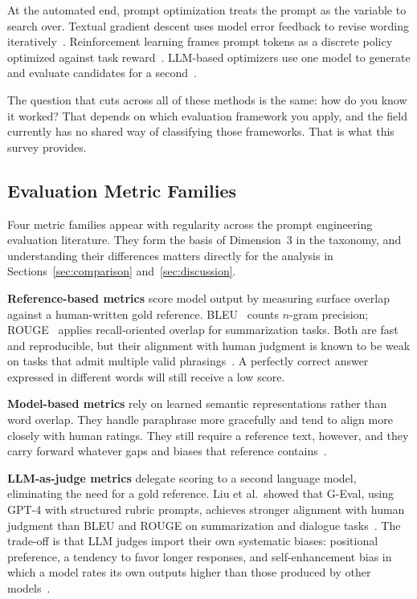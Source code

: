 \documentclass[journal]{IEEEtran}
\begin{document}
At the automated end, prompt optimization treats the prompt as the variable
to search over. Textual gradient descent uses model error feedback to
revise wording iteratively~\cite{pryzant2023apo}. Reinforcement learning
frames prompt tokens as a discrete policy optimized against task
reward~\cite{rlprompt2022}. LLM-based optimizers use one model to generate
and evaluate candidates for a second~\cite{zhou2022ape}.

The question that cuts across all of these methods is the same: how do
you know it worked? That depends on which evaluation framework you apply,
and the field currently has no shared way of classifying those frameworks. That is
what this survey provides.

\subsection{Evaluation Metric Families}

Four metric families appear with regularity across the prompt engineering
evaluation literature. They form the basis of Dimension~3 in the taxonomy, and
understanding their differences matters directly for the analysis in
Sections~\ref{sec:comparison} and~\ref{sec:discussion}.

\textbf{Reference-based metrics} score model output by measuring surface
overlap against a human-written gold reference. BLEU~\cite{papineni2002bleu} counts
$n$-gram precision; ROUGE~\cite{lin2004rouge} applies recall-oriented overlap
for summarization tasks. Both are fast and reproducible, but their alignment with human
judgment is known to be weak on tasks that admit multiple valid
phrasings~\cite{liu2023geval, repairing2022}. A perfectly correct answer expressed
in different words will still receive a low score.

\textbf{Model-based metrics} rely on learned semantic representations rather
than word overlap. They handle paraphrase more gracefully and tend to align more closely
with human ratings. They still require a reference text, however, and they
carry forward whatever gaps and biases that reference contains~\cite{chang2023survey}.

\textbf{LLM-as-judge metrics} delegate scoring to a second language model,
eliminating the need for a gold reference. Liu et al.\ showed that G-Eval, using
GPT-4 with structured rubric prompts, achieves stronger alignment with
human judgment than BLEU and ROUGE on
summarization and dialogue tasks~\cite{liu2023geval}.
The trade-off is that LLM judges import their own systematic biases:
positional preference, a tendency to favor longer responses, and
self-enhancement bias in which a model rates its own outputs higher than
those produced by other models~\cite{zheng2023judging, gu2025llmjudge}.
\end{document}
